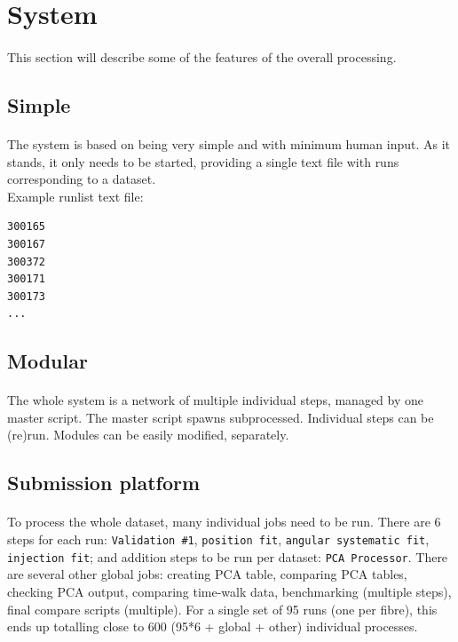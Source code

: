 \documentclass[12pt]{article}
\begin{document}
\clearpage

\section{System}
\paragraph{}
This section will describe some of the features of the overall processing.

\subsection{Simple}\label{subsec:simple}
\paragraph{}
The system is based on being very simple and with minimum human input. As it stands, it only needs to be started, providing a single text file with runs corresponding to a dataset.\\
Example runlist text file:
\begin{lstlisting}
300165
300167
300372
300171
300173
...
\end{lstlisting}

\subsection{Modular}
\paragraph{}
The whole system is a network of multiple individual steps, managed by one master script. The master script spawns subprocessed. Individual steps can be (re)run. Modules can be easily modified, separately.

\subsection{Submission platform}
\paragraph{}
To process the whole dataset, many individual jobs need to be run. There are 6 steps for each run: \texttt{Validation \#1}, \texttt{position fit}, \texttt{angular systematic fit}, \texttt{injection fit}; and addition steps to be run per dataset: \texttt{PCA Processor}. There are several other global jobs: creating PCA table, comparing PCA tables, checking PCA output, comparing time-walk data, benchmarking (multiple steps), final compare scripts (multiple). For a single set of 95 runs (one per fibre), this ends up totalling close to 600 (95*6 + global + other) individual processes.
\end{document}
